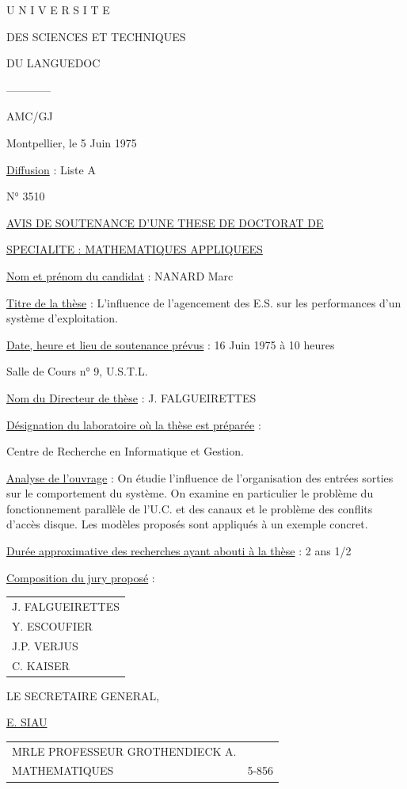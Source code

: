 
U N I V E R S I T E\par
DES SCIENCES ET TECHNIQUES\par
DU LANGUEDOC\par
------------\par
AMC/GJ

Montpellier, le 5 Juin 1975

\uline{Diffusion} : Liste A\par
N° 3510

\uline{AVIS DE SOUTENANCE D'UNE THESE DE DOCTORAT DE}\par
\uline{SPECIALITE : MATHEMATIQUES APPLIQUEES}

\uline{Nom et prénom du candidat} : NANARD Marc

\uline{Titre de la thèse} : L'influence de l'agencement des E.S. sur les performances
d'un système d'exploitation.

\uline{Date, heure et lieu de soutenance prévus} : 16 Juin 1975 à 10 heures\par
Salle de Cours n° 9, U.S.T.L.

\uline{Nom du Directeur de thèse} : J. FALGUEIRETTES

\uline{Désignation du laboratoire où la thèse est préparée} :\par
Centre de Recherche en Informatique et Gestion.

\uline{Analyse de l'ouvrage} : On étudie l'influence de l'organisation des entrées
sorties sur le comportement du système. On examine en particulier le problème
du fonctionnement parallèle de l'U.C. et des canaux et le problème des conflits
d'accès disque. Les modèles proposés sont appliqués à un exemple concret.

\uline{Durée approximative des recherches ayant abouti à la thèse} : 2 ans 1/2

\uline{Composition du jury proposé} :\par
\begin{tabular}{l}J. FALGUEIRETTES\\Y. ESCOUFIER\\J.P. VERJUS\\C. KAISER\end{tabular}

LE SECRETAIRE GENERAL,

\uline{E. SIAU}

\begin{tabular}{ll}
MR\quad LE PROFESSEUR GROTHENDIECK A.&\\[1em]
MATHEMATIQUES&5-856
\end{tabular}

